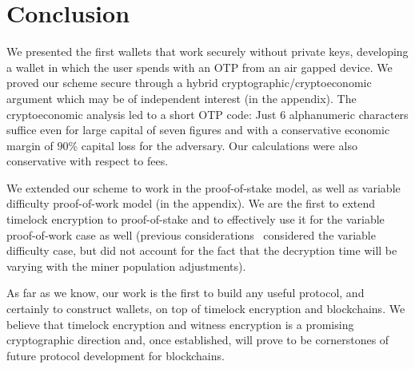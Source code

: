 \section{Conclusion}

We presented the first wallets that work securely without private
keys, developing a wallet in which the user spends with an
OTP from an air gapped device. We proved our scheme secure
through a hybrid cryptographic/cryptoeconomic argument which may be of
independent interest (in the appendix). The cryptoeconomic analysis led
to a short OTP code: Just $6$ alphanumeric characters suffice
even for large capital of seven figures and with a conservative economic
margin of $90\%$ capital loss for the adversary. Our calculations
were also conservative with respect to fees.

We extended our scheme to work in the proof-of-stake model, as well
as variable difficulty proof-of-work model (in the appendix).
We are the first to extend timelock encryption to proof-of-stake and to effectively
use it for the variable proof-of-work case as well (previous
considerations~\cite{timelock-bitcoin} considered the variable difficulty
case, but did not account for the fact that the decryption time will be
varying with the miner population adjustments).

As far as we know, our work is the first to build any useful protocol,
and certainly to construct wallets, on top of timelock encryption and
blockchains. We believe that timelock encryption and witness encryption
is a promising cryptographic direction and, once established, will prove
to be cornerstones of future protocol development for blockchains.
